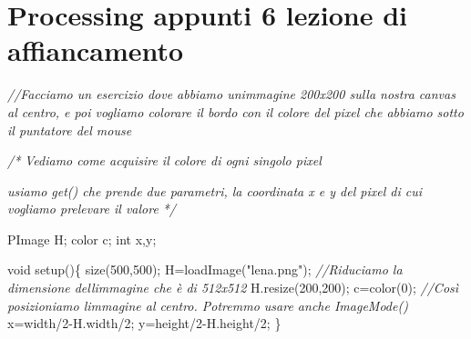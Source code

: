\documentclass[
]{article}
\author{}
\date{}
\newenvironment{Shaded}{}{}
\newcommand{\CommentTok}[1]{\textcolor[rgb]{0.38,0.63,0.69}{\textit{#1}}}
\newcommand{\DataTypeTok}[1]{\textcolor[rgb]{0.56,0.13,0.00}{#1}}
\newcommand{\DecValTok}[1]{\textcolor[rgb]{0.25,0.63,0.44}{#1}}
\newcommand{\FunctionTok}[1]{\textcolor[rgb]{0.02,0.16,0.49}{#1}}
\newcommand{\NormalTok}[1]{#1}
\newcommand{\OperatorTok}[1]{\textcolor[rgb]{0.40,0.40,0.40}{#1}}
\newcommand{\StringTok}[1]{\textcolor[rgb]{0.25,0.44,0.63}{#1}}
\begin{document}
\section{Processing appunti 6 lezione di
affiancamento}\label{processing-appunti-6-lezione-di-affiancamento}

\begin{Shaded}
\begin{Highlighting}[]
\CommentTok{//Facciamo un esercizio dove abbiamo un\textquotesingle{}immagine 200x200 sulla nostra canvas al centro, e poi vogliamo colorare il bordo con il colore del pixel che abbiamo sotto il puntatore del mouse}

\CommentTok{/*}
\CommentTok{Vediamo come acquisire il colore di ogni singolo pixel}

\CommentTok{usiamo get() che prende due parametri, la coordinata x e y del pixel di cui vogliamo prelevare il valore}
\CommentTok{*/}

\NormalTok{PImage H}\OperatorTok{;}
\NormalTok{color c}\OperatorTok{;}
\DataTypeTok{int}\NormalTok{ x}\OperatorTok{,}\NormalTok{y}\OperatorTok{;}

\DataTypeTok{void} \FunctionTok{setup}\OperatorTok{()\{}
  \FunctionTok{size}\OperatorTok{(}\DecValTok{500}\OperatorTok{,}\DecValTok{500}\OperatorTok{);}
\NormalTok{  H}\OperatorTok{=}\FunctionTok{loadImage}\OperatorTok{(}\StringTok{"lena.png"}\OperatorTok{);}
  \CommentTok{//Riduciamo la dimensione dell\textquotesingle{}immagine che è di 512x512}
\NormalTok{  H}\OperatorTok{.}\FunctionTok{resize}\OperatorTok{(}\DecValTok{200}\OperatorTok{,}\DecValTok{200}\OperatorTok{);}
\NormalTok{  c}\OperatorTok{=}\FunctionTok{color}\OperatorTok{(}\DecValTok{0}\OperatorTok{);}
  \CommentTok{//Così posizioniamo l\textquotesingle{}immagine al centro. Potremmo usare anche ImageMode()}
\NormalTok{  x}\OperatorTok{=}\NormalTok{width}\OperatorTok{/}\DecValTok{2}\OperatorTok{{-}}\NormalTok{H}\OperatorTok{.}\FunctionTok{width}\OperatorTok{/}\DecValTok{2}\OperatorTok{;}
\NormalTok{  y}\OperatorTok{=}\NormalTok{height}\OperatorTok{/}\DecValTok{2}\OperatorTok{{-}}\NormalTok{H}\OperatorTok{.}\FunctionTok{height}\OperatorTok{/}\DecValTok{2}\OperatorTok{;}
\OperatorTok{\}}


\end{Highlighting}
\end{Shaded}
\end{document}
